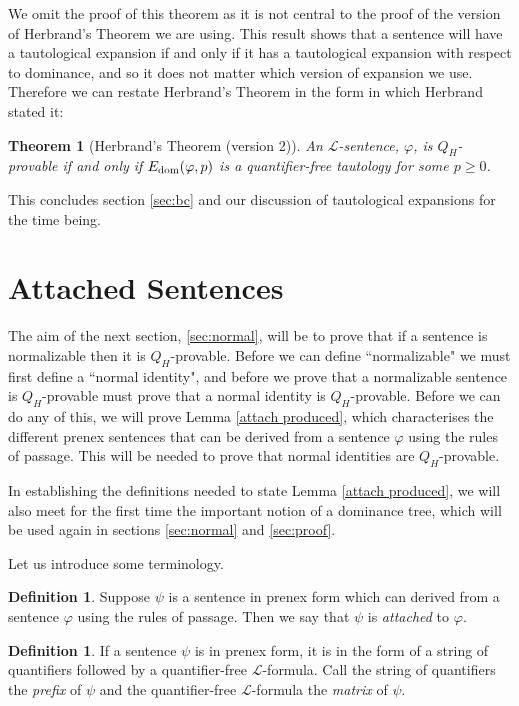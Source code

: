 \documentclass[a4paper,12pt]{report}
\newtheorem{theo}{Theorem}
\theoremstyle{definition}
\newtheorem{mydef}[lem]{Definition}
\begin{document}
We omit the proof of this theorem as it is not central to the proof of the version of Herbrand's Theorem we are using. This result shows that a sentence will have a tautological expansion if and only if it has a tautological expansion with respect to dominance, and so it does not matter which version of expansion we use. Therefore we can restate Herbrand's Theorem in the form in which Herbrand stated it:

\begin{theo}[Herbrand's Theorem (version 2)]
An $\mathcal{L}$-sentence, $\varphi$, is $Q_H$-provable if and only if $E_{\mbox{\scriptsize{dom}}}(\varphi, p)$ is a quantifier-free tautology for some $p \ge 0$.
\end{theo}

This concludes section \ref{sec:bc} and our discussion of tautological expansions for the time being.

\section{Attached Sentences}
\label{sec:attached}

The aim of the next section, \ref{sec:normal}, will be to prove that if a sentence is normalizable then it is $Q_H$-provable. Before we can define ``normalizable" we must first define a ``normal identity", and before we prove that a normalizable sentence is $Q_H$-provable must prove that a normal identity is $Q_H$-provable. Before we can do any of this, we will prove Lemma \ref{attach produced}, which characterises the different prenex sentences that can be derived from a sentence $\varphi$ using the rules of passage. This will be needed to prove that normal identities are $Q_H$-provable. 

In establishing the definitions needed to state Lemma \ref{attach produced}, we will also meet for the first time the important notion of a dominance tree, which will be used again in sections \ref{sec:normal} and \ref{sec:proof}.

Let us introduce some terminology.

\begin{mydef}
Suppose $\psi$ is a sentence in prenex form which can derived from a sentence $\varphi$ using the rules of passage. Then we say that $\psi$ is \emph{attached} to $\varphi$.
\end{mydef}

\begin{mydef}
If a sentence $\psi$ is in prenex form, it is in the form of a string of quantifiers followed by a quantifier-free $\mathcal{L}$-formula. Call the string of quantifiers the \emph{prefix} of $\psi$ and the quantifier-free $\mathcal{L}$-formula the \emph{matrix} of $\psi$.
\end{mydef}
\end{document}
